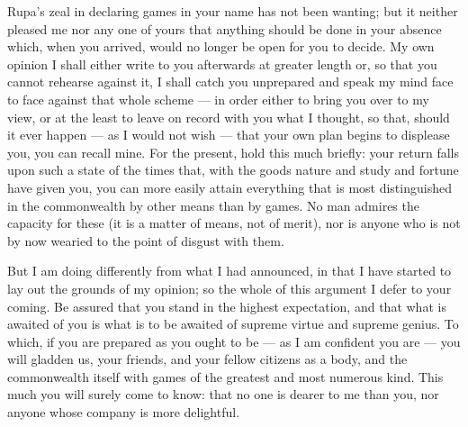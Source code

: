 

 Rupa's zeal in declaring games in your name has not been wanting; but it neither pleased me nor any one of yours that anything should be done in your absence which, when you arrived, would no longer be open for you to decide. My own opinion I shall either write to you afterwards at greater length or, so that you cannot rehearse against it, I shall catch you unprepared and speak my mind face to face against that whole scheme --- in order either to bring you over to my view, or at the least to leave on record with you what I thought, so that, should it ever happen --- as I would not wish --- that your own plan begins to displease you, you can recall mine. For the present, hold this much briefly: your return falls upon such a state of the times that, with the goods nature and study and fortune have given you, you can more easily attain everything that is most distinguished in the commonwealth by other means than by games. No man admires the capacity for these (it is a matter of means, not of merit), nor is anyone who is not by now wearied to the point of disgust with them.

 But I am doing differently from what I had announced, in that I have started to lay out the grounds of my opinion; so the whole of this argument I defer to your coming. Be assured that you stand in the highest expectation, and that what is awaited of you is what is to be awaited of supreme virtue and supreme genius. To which, if you are prepared as you ought to be --- as I am confident you are --- you will gladden us, your friends, and your fellow citizens as a body, and the commonwealth itself with games of the greatest and most numerous kind. This much you will surely come to know: that no one is dearer to me than you, nor anyone whose company is more delightful.
